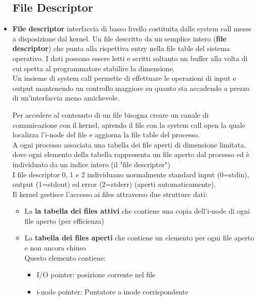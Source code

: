 \begin{flushleft}
\begin{itemize}
    \subsection{File Descriptor}
    \item \textbf{File descriptor} interfaccia di basso livello costituita dalle system call messe a 
            disposizione dal kernel. Un file \ace descritto da un semplice intero (\textbf{file descriptor}) che punta alla rispettiva 
            entry nella file table del sistema operativo. I dati possono essere letti e scritti 
            soltanto un buffer alla volta di cui spetta al programmatore stabilire la dimensione.\\
            Un insieme di system call permette di effettuare le operazioni di input e output 
            mantenendo un controllo maggiore su quanto sta accadendo a prezzo di 
            un'interfaccia meno amichevole.\par 
            Per accedere al contenuto di un file bisogna creare un canale di comunicazione con il 
            kernel, aprendo il file con la system call open la quale localizza l’i-node del file e 
            aggiorna la file table del processo.\\
            A ogni processo \ace associata una tabella dei file aperti 
            di dimensione limitata, dove ogni elemento della 
            tabella rappresenta un file aperto dal processo ed è 
            individuato da un indice intero (il "file descriptor")\\
            I file descriptor 0, 1 e 2 individuano normalmente 
            standard input (0=stdin), output (1=stdout) ed error (2=stderr) (aperti automaticamente). \\
            Il kernel gestisce l'accesso ai files attraverso due strutture dati: 
            \begin{itemize}
              \item La \textbf{la tabella dei files attivi} che contiene una copia dell'i-node di ogni file 
                    aperto (per efficienza)
              \item La \textbf{tabella dei files aperti} che contiene un elemento per ogni file aperto e 
                    non ancora chiuso\\ Questo elemento contiene:
                      \begin{itemize}
                        \item I/O pointer: posizione corrente nel file
                        \item i-node pointer: Puntatore a inode corrispondente

\end{itemize}
\end{itemize}
\end{itemize}
\end{flushleft}
